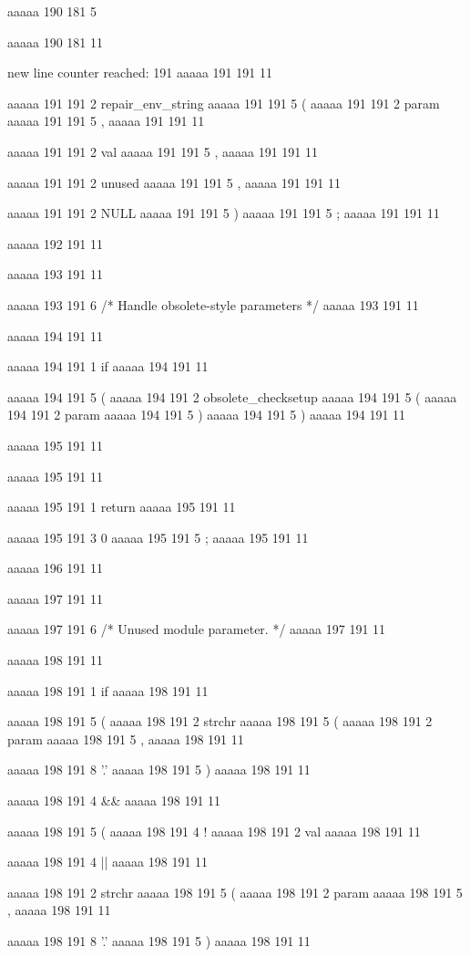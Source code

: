 aaaaa 190 181
5
{
aaaaa 190 181
11


new line counter reached: 191
aaaaa 191 191
11
	
aaaaa 191 191
2
repair_env_string
aaaaa 191 191
5
(
aaaaa 191 191
2
param
aaaaa 191 191
5
,
aaaaa 191 191
11
 
aaaaa 191 191
2
val
aaaaa 191 191
5
,
aaaaa 191 191
11
 
aaaaa 191 191
2
unused
aaaaa 191 191
5
,
aaaaa 191 191
11
 
aaaaa 191 191
2
NULL
aaaaa 191 191
5
)
aaaaa 191 191
5
;
aaaaa 191 191
11


aaaaa 192 191
11


aaaaa 193 191
11
	
aaaaa 193 191
6
/* Handle obsolete-style parameters */
aaaaa 193 191
11


aaaaa 194 191
11
	
aaaaa 194 191
1
if
aaaaa 194 191
11
 
aaaaa 194 191
5
(
aaaaa 194 191
2
obsolete_checksetup
aaaaa 194 191
5
(
aaaaa 194 191
2
param
aaaaa 194 191
5
)
aaaaa 194 191
5
)
aaaaa 194 191
11


aaaaa 195 191
11
	
aaaaa 195 191
11
	
aaaaa 195 191
1
return
aaaaa 195 191
11
 
aaaaa 195 191
3
0
aaaaa 195 191
5
;
aaaaa 195 191
11


aaaaa 196 191
11


aaaaa 197 191
11
	
aaaaa 197 191
6
/* Unused module parameter. */
aaaaa 197 191
11


aaaaa 198 191
11
	
aaaaa 198 191
1
if
aaaaa 198 191
11
 
aaaaa 198 191
5
(
aaaaa 198 191
2
strchr
aaaaa 198 191
5
(
aaaaa 198 191
2
param
aaaaa 198 191
5
,
aaaaa 198 191
11
 
aaaaa 198 191
8
'.'
aaaaa 198 191
5
)
aaaaa 198 191
11
 
aaaaa 198 191
4
&&
aaaaa 198 191
11
 
aaaaa 198 191
5
(
aaaaa 198 191
4
!
aaaaa 198 191
2
val
aaaaa 198 191
11
 
aaaaa 198 191
4
||
aaaaa 198 191
11
 
aaaaa 198 191
2
strchr
aaaaa 198 191
5
(
aaaaa 198 191
2
param
aaaaa 198 191
5
,
aaaaa 198 191
11
 
aaaaa 198 191
8
'.'
aaaaa 198 191
5
)
aaaaa 198 191
11
 
}
